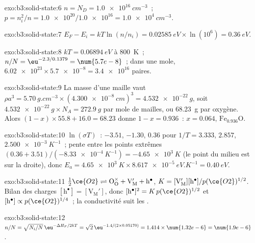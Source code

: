 \begin{solution}{exo:b3:solid-state:6}
$n = N_D = \qty{1.0e16}{cm^{-3}}$~; $p = n_i^2/n = \num{1.0e20}/\num{1.0e16} = \qty{1.0e4}{cm^{-3}}$.
\end{solution}

\begin{solution}{exo:b3:solid-state:7}
$E_F - E_i = kT\ln(n/n_i) = \qty{0.02585}{eV} \times \ln(10^6) = \qty{0.36}{eV}$.
\end{solution}

\begin{solution}{exo:b3:solid-state:8}
$kT = \qty{0.06894}{eV}$ à \qty{800}{K}~; $n/N = \eu^{-2.3/0.1379} = \num{5.7e-8}$~; dans une mole, $\num{6.02e23} \times \num{5.7e-8} = \num{3.4e16}$
paires.
\end{solution}

\begin{solution}{exo:b3:solid-state:9}
La masse d'une maille vaut $\rho a^3 = \qty{5.70}{g.cm^{-3}} \times (\qty{4.300e-8}{cm})^3 = \qty{4.532e-22}{g}$, soit
$\qty{4.532e-22}{g} \times N_A = \qty{272.9}{g}$ par mole de mailles, ou \qty{68.23}{g} par oxygène. Alors
$(1 - x) \times 55.8 + 16.0 = 68.23$ donne $1 - x = 0.936$~: $x = 0.064$, $\mathrm{Fe_{0.936}O}$.
\end{solution}

\begin{solution}{exo:b3:solid-state:10}
$\ln(\sigma T)$~: $-3.51$, $-1.30$, $0.36$ pour $1/T = 3.333$, $2.857$, $\qty{2.500e-3}{K^{-1}}$~; pente entre les points extrêmes
$(0.36 + 3.51)/(-\qty{8.33e-4}{K^{-1}}) = -\qty{4.65e3}{K}$ (le point du milieu est sur la droite), donc
$E_a = \qty{4.65e3}{K} \times \qty{8.617e-5}{eV.K^{-1}} = \qty{0.40}{eV}$.
\end{solution}

\begin{solution}{exo:b3:solid-state:11}
$\tfrac12\ce{O2} \rightleftharpoons \mathrm{O_O^{\times} + V_M' + h^{\bullet}}$, $K = [\mathrm{V_M'}][\mathrm h^\bullet]/p(\ce{O2})^{1/2}$. Bilan des charges $[\mathrm h^\bullet] = [\mathrm{V_M'}]$, donc
$[\mathrm h^\bullet]^2 = K\,p(\ce{O2})^{1/2}$ et $[\mathrm h^\bullet] \propto p(\ce{O2})^{1/4}$~; la conductivité suit les .
\end{solution}

\begin{solution}{exo:b3:solid-state:12}
$n/N = \sqrt{N_i/N}\,\eu^{-\Delta H_F/2kT} = \sqrt 2\,\eu^{-1.4/(2 \times 0.05170)} = 1.414 \times \num{1.32e-6} = \num{1.9e-6}$.
\end{solution}

